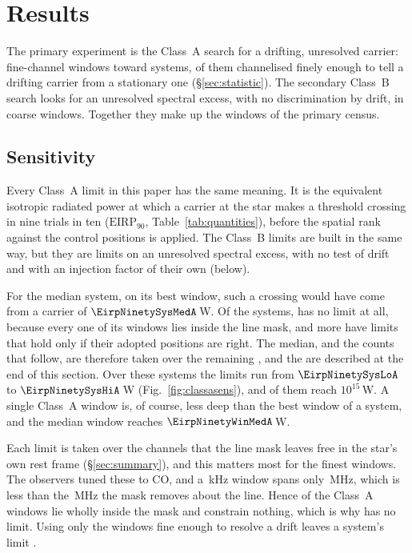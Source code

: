 \section{Results}
\label{sec:results}

The primary experiment is the Class~A search for a drifting, unresolved
carrier: \NWinA{} fine-channel windows toward \NSysClassA{} systems,
\EdrNWinA{} of them channelised finely enough to tell a drifting carrier from
a stationary one (\S\ref{sec:statistic}). The secondary Class~B search looks
for an unresolved spectral excess, with no discrimination by drift, in
\NWinB{} coarse windows. Together they make up the \NWindows{} windows of the
primary census.

\subsection{Sensitivity}
\label{sec:pninetysel}

Every Class~A limit in this paper has the same meaning. It is the
equivalent isotropic radiated power at which a carrier at the star makes a
threshold crossing in nine trials in ten ($\mathrm{EIRP}_{90}$,
Table~\ref{tab:quantities}), before the spatial rank against the control
positions is applied. The Class~B limits are built in the same way, but
they are limits on an unresolved spectral excess, with no test of drift and
with an injection factor of their own (below).

For the median system, on its best window, such a crossing would have come
from a carrier of $\EirpNinetySysMedA$\,W. Of the \NSysClassA{} systems,
\NSysALostName{} has no limit at all, because every one of its windows lies
inside the line mask, and \OmNFlagWord{} more have limits that hold only if
their adopted positions are right. The median, and the counts that follow,
are therefore taken over the remaining \NSysALimSum, and the
\OmNFlagWord{} are described at the end of this section. Over these systems
the limits run from $\EirpNinetySysLoA$ to $\EirpNinetySysHiA$\,W
(Fig.~\ref{fig:classasens}), and \NSysEfifteen{} of them reach
$10^{15}$\,W. A single Class~A window is, of course, less deep than the best
window of a system, and the median window reaches
$\EirpNinetyWinMedA$\,W.

Each limit is taken over the channels that the line mask leaves free in the
star's own rest frame (\S\ref{sec:summary}), and this matters most for the
finest windows. The observers tuned these to CO, and a
\UmFineChanKHz\,kHz window spans only \UmFineBwMHz\,MHz, which is less than
the \UmFineMaskMHz\,MHz the mask removes about the line. Hence
\UmNWinAFull{} of the Class~A windows lie wholly inside the mask and
constrain nothing, which is why \NSysALostName{} has no limit. Using only the
\EdrNWinA{} windows fine enough to resolve a drift leaves a system's limit
\ScEdrMedClause.

